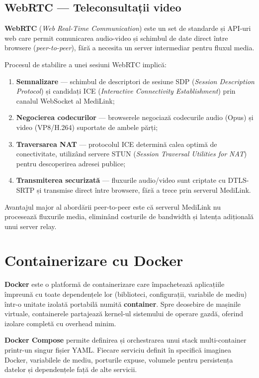 \subsection{WebRTC --- Teleconsultații video}

\textbf{WebRTC} (\textit{Web Real-Time Communication}) \cite{webrtc2024} este un set de standarde și API-uri web care permit comunicarea audio-video și schimbul de date direct între browsere (\textit{peer-to-peer}), fără a necesita un server intermediar pentru fluxul media.

Procesul de stabilire a unei sesiuni WebRTC implică:
\begin{enumerate}
  \item \textbf{Semnalizare} --- schimbul de descriptori de sesiune SDP (\textit{Session Description Protocol}) și candidați ICE (\textit{Interactive Connectivity Establishment}) prin canalul WebSocket al MediLink;
  \item \textbf{Negocierea codecurilor} --- browserele negociază codecurile audio (Opus) și video (VP8/H.264) suportate de ambele părți;
  \item \textbf{Traversarea NAT} --- protocolul ICE determină calea optimă de conectivitate, utilizând servere STUN (\textit{Session Traversal Utilities for NAT}) pentru descoperirea adresei publice;
  \item \textbf{Transmiterea securizată} --- fluxurile audio/video sunt criptate cu DTLS-SRTP și transmise direct între browsere, fără a trece prin serverul MediLink.
\end{enumerate}

Avantajul major al abordării peer-to-peer este că serverul MediLink nu procesează fluxurile media, eliminând costurile de bandwidth și latența adițională unui server relay.

\section{Containerizare cu Docker}

\textbf{Docker} \cite{docker2024} este o platformă de containerizare care împachetează aplicațiile împreună cu toate dependențele lor (biblioteci, configurații, variabile de mediu) într-o unitate izolată portabilă numită \textbf{container}. Spre deosebire de mașinile virtuale, containerele partajează kernel-ul sistemului de operare gazdă, oferind izolare completă cu overhead minim.

\textbf{Docker Compose} permite definirea și orchestrarea unui stack multi-container printr-un singur fișier YAML. Fiecare serviciu definit în  specifică imaginea Docker, variabilele de mediu, porturile expuse, volumele pentru persistența datelor și dependențele față de alte servicii.

